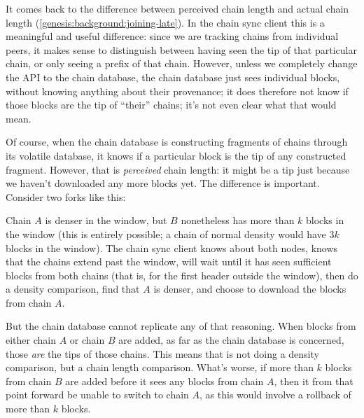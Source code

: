 It comes back to the difference between perceived chain length and actual chain
length (\cref{genesis:background:joining-late}). In the chain sync client this
is a meaningful and useful difference: since we are tracking chains from
individual peers, it makes sense to distinguish between having seen the tip of
that particular chain, or only seeing a prefix of that chain. However, unless we
completely change the API to the chain database, the chain database just sees
individual blocks, without knowing anything about their provenance;  it  does
therefore not know if those blocks are the tip of ``their'' chains; it's not
even clear what that would mean.

Of course, when the chain database is constructing fragments of chains through
its volatile database, it knows if a particular block is the tip of any
constructed fragment. However, that is \emph{perceived} chain length: it might
be a tip just because we haven't downloaded any more blocks yet. The difference
is important. Consider two forks like this:
%
\begin{center}
\end{center}
%
Chain $A$ is denser in the window, but $B$ nonetheless has more than $k$ blocks
in the window (this is entirely possible; a chain of normal density would have
$3k$ blocks in the window).  The chain sync client knows about both nodes, knows
that the chains extend past the window, will wait until it has seen sufficient
blocks from both chains (that is, for the first header outside the window), then
do a density comparison, find that $A$ is denser, and choose to download the
blocks from chain $A$.

\pagebreak

But the chain database cannot replicate any of that reasoning. When blocks  from
either chain $A$ or chain $B$ are added, as far as the chain database is
concerned, those \emph{are} the tips of those chains. This means that is not
doing a density comparison, but a chain length comparison. What's worse, if more
than $k$ blocks from chain $B$ are added before it sees any blocks from chain
$A$, then it from that point forward be unable to switch to chain $A$, as this
would involve a rollback of more than $k$ blocks.

